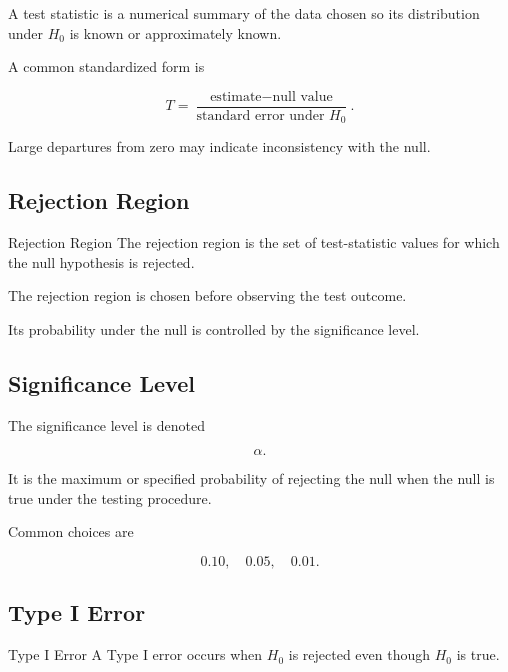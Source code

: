 A test statistic is a numerical summary of the data chosen so its
distribution under \(H_0\) is known or approximately known.

A common standardized form is

\[
\boxed{
T
=
\frac{
\text{estimate}
-
\text{null value}
}{
\text{standard error under }H_0
}.
}
\]

Large departures from zero may indicate inconsistency with the null.

\subsection{Rejection Region}
\label{subsec:rejection-region}

\begin{definitionbox}{Rejection Region}
The rejection region is the set of test-statistic values for which the
null hypothesis is rejected.
\end{definitionbox}

The rejection region is chosen before observing the test outcome.

Its probability under the null is controlled by the significance level.

\subsection{Significance Level}
\label{subsec:significance-level}

The significance level is denoted

\[
\boxed{
\alpha.
}
\]

It is the maximum or specified probability of rejecting the null when
the null is true under the testing procedure.

Common choices are

\[
\boxed{
0.10,
\quad
0.05,
\quad
0.01.
}
\]

\subsection{Type I Error}
\label{subsec:type-i-error}

\begin{definitionbox}{Type I Error}
A Type I error occurs when \(H_0\) is rejected even though \(H_0\) is
true.
\end{definitionbox}

